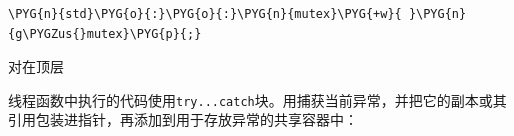 \begin{codeblockbg}
\begin{Verbatim}[commandchars=\\\{\},breaklines=true,breakanywhere=true,fontsize=\codefont,xleftmargin=17bp]
\PYG{n}{std}\PYG{o}{:}\PYG{o}{:}\PYG{n}{mutex}\PYG{+w}{ }\PYG{n}{g\PYGZus{}mutex}\PYG{p}{;}
\end{Verbatim}
\end{codeblockbg}



对在顶层



线程函数中执行的代码使用\texttt{try...\allowbreak{}catch}块。用捕获当前异常，并把它的副本或其引用包装进指针，再添加到用于存放异常的共享容器中：



